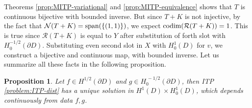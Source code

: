 \documentclass[10pt, a4paper, twoside, openright]{book}
\theoremstyle{definition}
\theoremstyle{plain}
\theoremstyle{plain}
\theoremstyle{plain}
\newtheorem{proposition}[subsection]{Proposition}
\theoremstyle{plain}
\theoremstyle{plain}
\theoremstyle{plain}
\theoremstyle{plain}
\theoremstyle{plain}
\begin{document}
Theorems \ref{prop:MITP-variational} and \ref{prop:MITP-equivalence} shows that $T$ is continuous bijective with bounded inverse. But since $T+K$ is not injective, by the fact that $\mathcal{N}(T+K)=\textup{span}(\{(1,1)\})$, we expect $\textup{codim}(\mathcal{R}(T+K))=1$. This is true since $\mathcal{R}(T+K)$ is equal to $Y$ after substitution of forth slot with $H^{-1/2}_0(\partial D)$. Substituting even second slot in $X$ with $H^1_0(D)$ for $v$, we construct a bijective and continuous map, with bounded inverse.
Let us summarize all these facts in the following proposition.
\begin{proposition}
 Let $f\in H^{1/2}(\partial D)$ and $g\in H^{\,-1/2}_0(\partial D)$, then ITP \ref{problem:ITP-dist} has a unique solution in $H^1(D)\times H^1_0(D)$, which depends continuously from data $f,g$.
\end{proposition}
\end{document}
